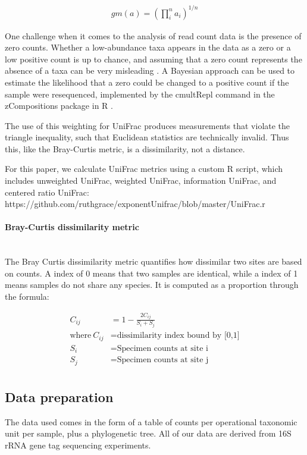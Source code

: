 \documentclass[10pt,letterpaper]{article}
\begin{document}
\begin{align*}
gm(a) = \left( \prod_{i}^{n} a_{i}\right)^{1/n}
\end{align*}

One challenge when it comes to the analysis of read count data is the presence of zero counts. Whether a low-abundance taxa appears in the data as a zero or a low positive count is up to chance, and assuming that a zero count represents the absence of a taxa can be very misleading \cite{fernandes2013anova}. A Bayesian approach can be used to estimate the likelihood that a zero could be changed to a positive count if the sample were resequenced, implemented by the cmultRepl command in the zCompositions package in R \cite{palarea2015zcompositions}.

The use of this weighting for UniFrac produces measurements that violate the triangle inequality, such that Euclidean statistics are technically invalid. Thus this, like the Bray-Curtis metric, is a dissimilarity, not a distance.

For this paper, we calculate UniFrac metrics using a custom R script, which includes unweighted UniFrac, weighted UniFrac, information UniFrac, and centered ratio UniFrac: https://github.com/ruthgrace/exponentUnifrac/blob/master/UniFrac.r

\paragraph{Bray-Curtis dissimilarity metric}\mbox{}\\
The Bray Curtis dissimilarity metric \cite{beals1984bray} quantifies how dissimilar two sites are based on counts. A index of 0 means that two samples are identical, while a index of 1 means samples do not share any species. It is computed as a proportion through the formula:

\begin{align*}
C_{ij} &= 1 - \frac{2C_{ij}}{S_{i} + S_{j}} \\
\text{where}~C_{ij}&= \text{dissimilarity index bound by [0,1]} \\
  S_{i} &= \text{Specimen counts at site i} \\
  S_{j} &= \text{Specimen counts at site j} \\
\end{align*}

\subsection{Data preparation}
The data used comes in the form of a table of counts per operational taxonomic unit per sample, plus a phylogenetic tree. All of our data are derived from 16S rRNA gene tag sequencing experiments.
\end{document}
